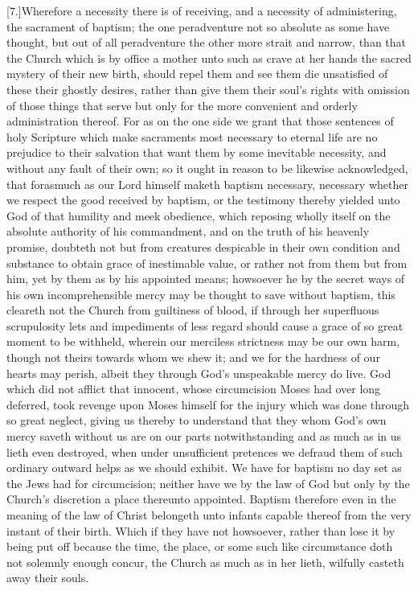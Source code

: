 [7.]Wherefore a necessity there is of receiving, and a necessity of administering, the sacrament of baptism; the one peradventure not so absolute as some have thought, but out of all peradventure the other more strait and narrow, than that the Church which is by office a mother unto such as crave at her hands the sacred mystery of their new birth, should repel them and see them die unsatisfied of these their ghostly desires, rather than give them their soul’s rights with omission of those things that serve but only for the more convenient and orderly administration thereof. For as on the one side we grant that those sentences of holy Scripture which make sacraments most necessary to eternal life are no prejudice to their salvation that want them by some inevitable necessity, and without any fault of their own; so it ought in reason to be likewise acknowledged, that forasmuch as our Lord himself maketh  baptism necessary,
 necessary whether we respect the good received by baptism, or the testimony thereby yielded unto God of that humility and meek obedience, which reposing wholly itself on the absolute authority of his commandment, and on the truth of his heavenly promise, doubteth not but from creatures despicable in their own condition and substance to obtain grace of inestimable value, or rather not from them but from him, yet by them as by his appointed means; howsoever he by the secret ways of his own incomprehensible mercy may be thought to save without baptism, this cleareth not the Church from guiltiness of blood, if through her superfluous scrupulosity lets and impediments of less regard should cause a grace of so great moment to be withheld, wherein our merciless strictness may be our own harm, though not theirs towards whom we shew it; and we for the hardness of our hearts may perish, albeit they through God’s unspeakable mercy do live. God which did not afflict that innocent, whose circumcision Moses had over long deferred, took revenge upon Moses himself for the injury which was done through so great neglect, giving us thereby to understand that they whom God’s own mercy saveth without us are on our parts notwithstanding and as much as in us lieth even destroyed, when under unsufficient pretences we defraud them of such ordinary outward helps as we should exhibit. We have for baptism no day set as the Jews had for circumcision; neither have we by the law of God but only by the Church’s discretion a place thereunto appointed. Baptism therefore even in the meaning of the law of Christ belongeth unto infants capable thereof from the very instant of their birth. Which if they have not howsoever, rather than lose it by being put off because the time, the place, or some such like circumstance doth not solemnly enough concur, the Church as much as in her lieth, wilfully casteth away their souls.


